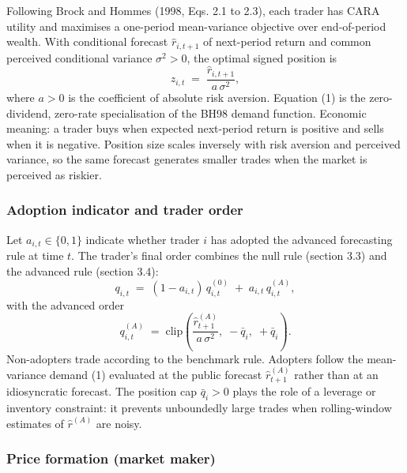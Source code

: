 \documentclass[11pt]{article}
\begin{document}
Following Brock and Hommes (1998, Eqs. 2.1 to 2.3), each trader has CARA utility and maximises a one-period mean-variance objective over end-of-period wealth. With conditional forecast $\hat{r}_{i,t+1}$ of next-period return and common perceived conditional variance $\sigma^{2} > 0$, the optimal signed position is
\begin{equation}
  z_{i,t} \;=\; \frac{\hat{r}_{i,t+1}}{a\, \sigma^{2}},
\end{equation}
where $a > 0$ is the coefficient of absolute risk aversion. Equation (1) is the zero-dividend, zero-rate specialisation of the BH98 demand function. Economic meaning: a trader buys when expected next-period return is positive and sells when it is negative. Position size scales inversely with risk aversion and perceived variance, so the same forecast generates smaller trades when the market is perceived as riskier.

\subsubsection{Adoption indicator and trader order}

Let $a_{i,t} \in \{0, 1\}$ indicate whether trader $i$ has adopted the advanced forecasting rule at time $t$. The trader's final order combines the null rule (section 3.3) and the advanced rule (section 3.4):
\begin{equation}
  q_{i,t} \;=\; (1 - a_{i,t})\, q_{i,t}^{(0)} \;+\; a_{i,t}\, q_{i,t}^{(A)},
\end{equation}
with the advanced order
\begin{equation}
  q_{i,t}^{(A)} \;=\; \mathrm{clip}\!\left(\frac{\hat{r}_{t+1}^{(A)}}{a\, \sigma^{2}},\; -\bar{q}_{i},\; +\bar{q}_{i}\right).
\end{equation}
Non-adopters trade according to the benchmark rule. Adopters follow the mean-variance demand (1) evaluated at the public forecast $\hat{r}_{t+1}^{(A)}$ rather than at an idiosyncratic forecast. The position cap $\bar{q}_{i} > 0$ plays the role of a leverage or inventory constraint: it prevents unboundedly large trades when rolling-window estimates of $\hat{r}^{(A)}$ are noisy.

\subsubsection{Price formation (market maker)}
\end{document}
